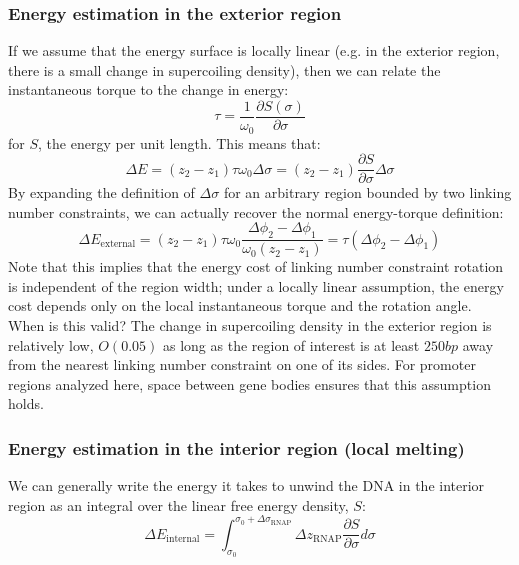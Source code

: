 \documentclass[11pt]{article}
\begin{document}
\subsubsection{Energy estimation in the exterior region}
If we assume that the energy surface is locally linear (e.g. in the exterior region, there is a small change in supercoiling density), then we can relate the instantaneous torque to the change in energy:
\[ \tau = \frac{1}{\omega_0} \frac{\partial S(\sigma)}{\partial \sigma}\]
for \(S\), the energy per unit length. This means that:
\begin{equation}
    \Delta E = (z_2 - z_1) \tau \omega_0 \Delta \sigma = (z_2 - z_1) \frac{\partial S}{\partial \sigma} \Delta \sigma
\end{equation}
By expanding the definition of \(\Delta \sigma\) for an arbitrary region bounded by two linking number constraints, we can actually recover the normal energy-torque definition:
\begin{equation}
    \Delta E_\text{external} = (z_2 - z_1) \tau \omega_0 \frac{\Delta\phi_2 - \Delta\phi_1}{\omega_0 (z_2 - z_1)} = \tau (\Delta \phi_2 - \Delta\phi_1) \label{eq:external_de}
\end{equation}
Note that this implies that the energy cost of linking number constraint rotation is independent of the region width; under a locally linear assumption, the energy cost depends only on the local instantaneous torque and the rotation angle. When is this valid? The change in supercoiling density in the exterior region is relatively low, \(O(0.05)\) as long as the region of interest is at least \(250bp\) away from the nearest linking number constraint on one of its sides. For promoter regions analyzed here, space between gene bodies ensures that this assumption holds.

\subsubsection{Energy estimation in the interior region (local melting)}
We can generally write the energy it takes to unwind the DNA in the interior region as an integral over the linear free energy density, \(S\):
\[\Delta E_\text{internal} =  \int_{\sigma_0}^{\sigma_0 + \Delta \sigma_\text{RNAP}} \Delta z_\text{RNAP} \frac{\partial S}{\partial \sigma} d\sigma\]
\end{document}
